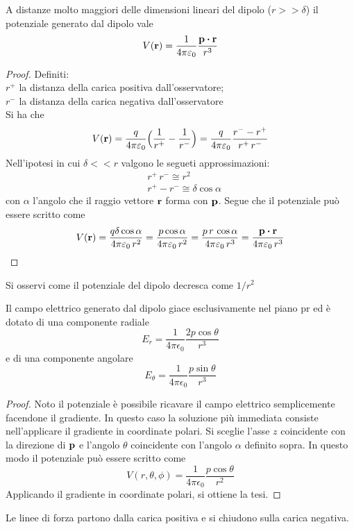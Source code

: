 \begin{thm}
    A distanze molto maggiori delle dimensioni lineari del dipolo ($r>>\delta$) il potenziale generato dal dipolo vale
    \begin{equation}
        \label{eqn:V_dipolo}
        V(\vb{r})=\frac{1}{4\pi\epsilon_0}\frac{\vb{p}\vdot\vb{r}}{r^3}
    \end{equation}
\end{thm}
\begin{proof}
    Definiti:\\
    $r^+$ la distanza della carica positiva dall'osservatore; \\
    $r^-$ la distanza della carica negativa dall'osservatore\\
    Si ha che
    \[
        V(\vb{r})=\frac{q}{4\pi\varepsilon_0}\Bigl(\frac{1}{r^+}-\frac{1}{r^-}\Bigr)=\frac{q}{4\pi\varepsilon_0}\frac{r^--r^+}{r^+\,r^-}
    \]
    Nell'ipotesi in cui $\delta<<r$ valgono le segueti approssimazioni:
    \[
        \begin{split}
            & r^+\,r^- \cong r^2\\
            & r^+-r^- \cong \delta\cos\alpha
        \end{split}
    \]
    con $\alpha$ l'angolo che il raggio vettore $\vb{r}$ forma con $\vb{p}$.
    Segue che il potenziale può essere scritto come
    \[
        V(\vb{r})=\frac{q\delta\cos\alpha}{4\pi\epsilon_0\, r^2}=\frac{p\cos\alpha}{4\pi\epsilon_0\, r^2}=
        \frac{p\,r\,\cos\alpha}{4\pi\epsilon_0\, r^3}=\frac{\vb{p}\vdot \vb{r}}{4\pi\epsilon_0\, r^3}
    \]
\end{proof}
Si osservi come il potenziale del dipolo decresca come $1/r^2$
\begin{cor}
    Il campo elettrico generato dal dipolo giace esclusivamente nel piano pr ed è dotato di una componente radiale
    \[
        E_r=\frac{1}{4\pi\epsilon_0}\frac{2p\cos\theta}{r^3}
    \]
    e di una componente angolare
    \[
        E_\theta=\frac{1}{4\pi\epsilon_0}\frac{p\sin\theta}{r^3}
    \]
\end{cor}
\begin{proof}
    Noto il potenziale è possibile ricavare il campo elettrico semplicemente facendone il gradiente.
    In questo caso la soluzione più immediata consiste nell'applicare il gradiente in coordinate polari.
    Si sceglie l'asse $z$ coincidente con la direzione di $\vb{p}$ e l'angolo $\theta$ coincidente con l'angolo $\alpha$ definito sopra.
    In questo modo il potenziale può essere scritto come
    \[
        V(r,\theta,\phi)=\frac{1}{4\pi\epsilon_0}\frac{p\cos\theta}{r^2}
    \]
    Applicando il gradiente in coordinate polari, si ottiene la tesi.
\end{proof}
Le linee di forza partono dalla carica positiva e si chiudono sulla carica negativa.

